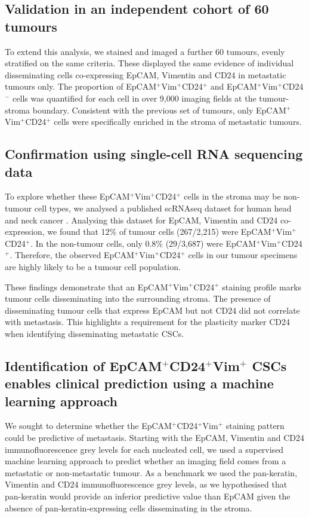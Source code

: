 \documentclass[11pt]{article}
\begin{document}
\subsection{Validation in an independent cohort of 60 tumours}

To extend this analysis, we stained and imaged a further 60 tumours, evenly stratified on the same criteria. These displayed the same evidence of individual disseminating cells co-expressing EpCAM, Vimentin and CD24 in metastatic tumours only. The proportion of EpCAM$^+$Vim$^+$CD24$^+$ and EpCAM$^+$Vim$^+$CD24$^-$ cells was quantified for each cell in over 9,000 imaging fields at the tumour-stroma boundary. Consistent with the previous set of tumours, only EpCAM$^+$Vim$^+$CD24$^+$ cells were specifically enriched in the stroma of metastatic tumours.

\subsection{Confirmation using single-cell RNA sequencing data}

To explore whether these EpCAM$^+$Vim$^+$CD24$^+$ cells in the stroma may be non-tumour cell types, we analysed a published scRNAseq dataset for human head and neck cancer \citep{puram2017}. Analysing this dataset for EpCAM, Vimentin and CD24 co-expression, we found that 12\% of tumour cells (267/2,215) were EpCAM$^+$Vim$^+$CD24$^+$. In the non-tumour cells, only 0.8\% (29/3,687) were EpCAM$^+$Vim$^+$CD24$^+$. Therefore, the observed EpCAM$^+$Vim$^+$CD24$^+$ cells in our tumour specimens are highly likely to be a tumour cell population.

These findings demonstrate that an EpCAM$^+$Vim$^+$CD24$^+$ staining profile marks tumour cells disseminating into the surrounding stroma. The presence of disseminating tumour cells that express EpCAM but not CD24 did not correlate with metastasis. This highlights a requirement for the plasticity marker CD24 when identifying disseminating metastatic CSCs.

\subsection{Identification of EpCAM$^+$CD24$^+$Vim$^+$ CSCs enables clinical prediction using a machine learning approach}

We sought to determine whether the EpCAM$^+$CD24$^+$Vim$^+$ staining pattern could be predictive of metastasis. Starting with the EpCAM, Vimentin and CD24 immunofluorescence grey levels for each nucleated cell, we used a supervised machine learning approach to predict whether an imaging field comes from a metastatic or non-metastatic tumour. As a benchmark we used the pan-keratin, Vimentin and CD24 immunofluorescence grey levels, as we hypothesised that pan-keratin would provide an inferior predictive value than EpCAM given the absence of pan-keratin-expressing cells disseminating in the stroma.
\end{document}
